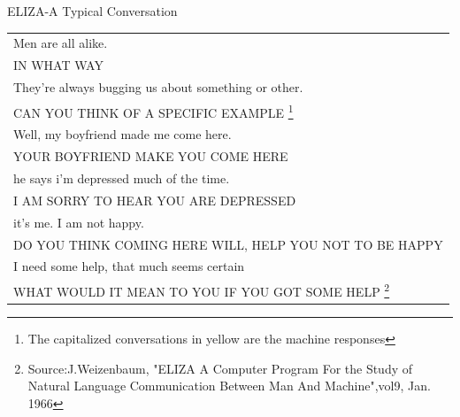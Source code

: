 \begin{frame}{ELIZA-A Typical Conversation}
\begin{table}
	\begin{tabular}{l}
		Men are all alike. \\
		\color{yellow}IN WHAT WAY \\
		They're always bugging us about something or other. \\
		\color{yellow}CAN YOU THINK OF A SPECIFIC EXAMPLE \footnote{The capitalized conversations in {\color{yellow} yellow} are the machine responses}\\
		Well, my boyfriend made me come here. \\
		\color{yellow}YOUR BOYFRIEND MAKE YOU COME HERE \\
		he says i'm depressed much of the time. \\
		\color{yellow}I AM SORRY TO HEAR YOU ARE DEPRESSED\\
		it's me. I am not happy.\\
		\color{yellow}DO YOU  THINK    COMING  HERE WILL, HELP YOU NOT TO BE HAPPY \\
		I need some help, that much seems certain\\
		\color{yellow}WHAT WOULD IT MEAN TO YOU IF YOU GOT SOME HELP
		\footnote{Source:J.Weizenbaum, "ELIZA     A     Computer Program For the Study of Natural Language Communication Between Man And Machine",vol9, Jan. 1966  }
	\end{tabular}

\end{table}
\end{frame}



